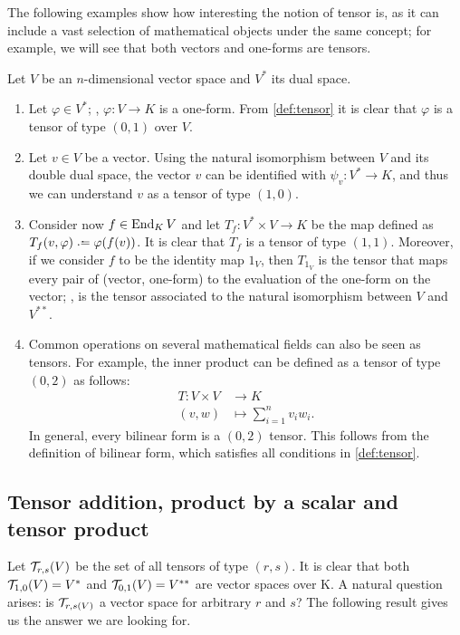 \begin{example}
	\label{ex:tensors}
	The following examples show how interesting the notion of tensor is, as it can include a vast selection of mathematical objects under the same concept; for example, we will see that both vectors and one-forms are tensors.

	Let $V$ be an $n$-dimensional vector space and $V^*$ its dual space.
	\begin{enumerate}
		\item Let $\varphi \in V^*$; \ie,  $\varphi \colon V \to K$ is a one-form. From \autoref{def:tensor} it is clear that $\varphi$ is a tensor of type $(0,1)$ over $V$.
		\item Let $v \in V$ be a vector. Using the natural isomorphism between $V$ and its double dual space, the vector $v$ can be identified with $\psi_v \colon V^* \to K$, and thus we can understand $v$ as a tensor of type $(1,0)$.
		\item Consider now $f \in \operatorname{End}_K V$ and let $T_f \colon V^* \times V \to K$ be the map defined as $T_f(v, \varphi) \defeq \varphi(f(v))$. It is clear that $T_f$ is a tensor of type $(1,1)$. Moreover, if we consider $f$ to be the identity map $1_V$, then $T_{1_V}$ is the tensor that maps every pair of (vector, one-form) to the evaluation of the one-form on the vector; \ie, is the tensor associated to the natural isomorphism between $V$ and $V^{**}$.
		\item Common operations on several mathematical fields can also be seen as tensors. For example, the inner product can be defined as a tensor of type $(0,2)$ as follows:
		\begin{align*}
			T \colon V \times V &\to K\\
			(v,w) &\mapsto \sum_{i=1}^n v_i w_i.
		\end{align*}
		In general, every bilinear form is a $(0,2)$ tensor. This follows from the definition of bilinear form, which satisfies all conditions in \autoref{def:tensor}.
	\end{enumerate}
\end{example}

\subsection{Tensor addition, product by a scalar and tensor product}
Let ${\mathcal T}_{r,s}(V)$ be the set of all tensors of type $(r,s)$. It is clear that both ${\mathcal T}_{1,0}(V) = V^*$ and ${\mathcal T}_{0,1}(V) = V^{**}$ are vector spaces over K. A natural question arises: is ${\mathcal T}_{r,s(V)}$ a vector space for arbitrary $r$ and $s$? The following result gives us the answer we are looking for.

